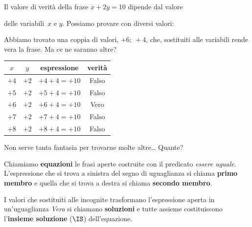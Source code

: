 \begin{esempio}{}{}
Il valore di verità della frase \(x + 2y = 10\) dipende dal valore 

{
delle variabili~\(x\) e \(y\). Possiamo provare con diversi valori: 

\vspace{.5em}
Abbiamo trovato una coppia di valori, \(+6;~ +4\), che, 
sostituiti alle variabili rende vera la frase.
Ma ce ne saranno altre?
}{
\begin{center}
\begin{tabular}{cccc}
\(x\) & \(y\) & espressione & verità\\
\hline
\(+4\) & \(+2\) & \(+4 +4 = +10\) & Falso\\
\(+5\) & \(+2\)& \(+5 +4 = +10\) & Falso\\
\(+6\) & \(+2\)& \(+6 +4 = +10\) & Vero\\
\(+7\) & \(+2\)& \(+7 +4 = +10\) & Falso\\
\(+8\) & \(+2\)& \(+8 +4 = +10\) & Falso\\
\end{tabular}
\end{center}
}

Non serve tanta fantasia per trovarne molte altre\dots
Quante?
\end{esempio}

% 


\begin{definizione}{}{}
  
Chiamiamo \textbf{equazioni} le frasi aperte costruite con il predicato 
\emph{essere uguale}. 
L'espressione che si trova a sinistra del segno di uguaglianza si chiama 
\textbf{primo membro} e quella che si trova a destra si chiama 
\textbf{secondo membro}.

I valori che sostituiti alle incognite trasformano l'espressione aperta 
in un'uguaglianza \emph{Vera} si chiamano \textbf{soluzioni} 
e tutte assieme costituiscono l'\textbf{insieme soluzione} (\(\IS\)) 
dell'equazione.
\end{definizione}

